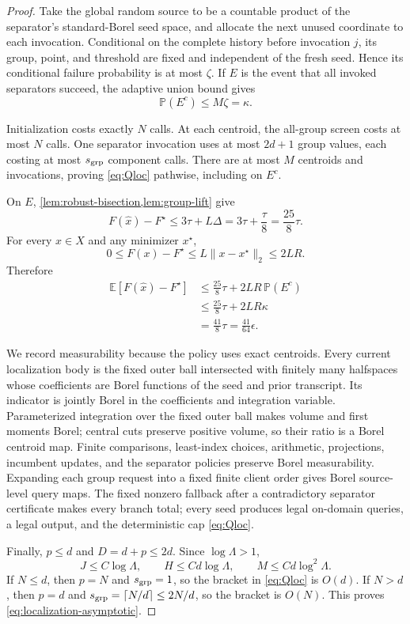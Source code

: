 \documentclass[11pt]{article}
\numberwithin{equation}{section}
\theoremstyle{remark}
\theoremstyle{definition}
\newcommand{\E}{\mathbb{E}}
\newcommand{\Pp}{\mathbb{P}}
\newcommand{\norm}[1]{\lVert #1\rVert_2}
\newcommand{\eps}{\epsilon}
\begin{document}
\begin{proof}
Take the global random source to be a countable product of the separator's standard-Borel seed space, and allocate the next unused coordinate to each invocation.  Conditional on the complete history before invocation $j$, its group, point, and threshold are fixed and independent of the fresh seed.  Hence its conditional failure probability is at most $\zeta$.  If $E$ is the event that all invoked separators succeed, the adaptive union bound gives
\[
\Pp(E^c)\le M\zeta=\kappa.
\]

Initialization costs exactly $N$ calls.  At each centroid, the all-group screen costs at most $N$ calls.  One separator invocation uses at most $2d+1$ group values, each costing at most $s_{\rm grp}$ component calls.  There are at most $M$ centroids and invocations, proving \eqref{eq:Qloc} pathwise, including on $E^c$.

On $E$, \cref{lem:robust-bisection,lem:group-lift} give
\[
F(\widehat x)-F^\star
\le3\tau+L\Delta
=3\tau+\frac\tau8
=\frac{25}{8}\tau.
\]
For every $x\in X$ and any minimizer $x^\star$,
\[
0\le F(x)-F^\star\le L\norm{x-x^\star}\le2LR.
\]
Therefore
\begin{align*}
\E[F(\widehat x)-F^\star]
&\le\frac{25}{8}\tau+2LR\,\Pp(E^c)\\
&\le\frac{25}{8}\tau+2LR\kappa\\
&=\frac{41}{8}\tau
=\frac{41}{64}\eps.
\end{align*}

We record measurability because the policy uses exact centroids.  Every current localization body is the fixed outer ball intersected with finitely many halfspaces whose coefficients are Borel functions of the seed and prior transcript.  Its indicator is jointly Borel in the coefficients and integration variable.  Parameterized integration over the fixed outer ball makes volume and first moments Borel; central cuts preserve positive volume, so their ratio is a Borel centroid map.  Finite comparisons, least-index choices, arithmetic, projections, incumbent updates, and the separator policies preserve Borel measurability.  Expanding each group request into a fixed finite client order gives Borel source-level query maps.  The fixed nonzero fallback after a contradictory separator certificate makes every branch total; every seed produces legal on-domain queries, a legal output, and the deterministic cap \eqref{eq:Qloc}.

Finally, $p\le d$ and $D=d+p\le2d$.  Since $\log\Lambda>1$,
\[
J\le C\log\Lambda,
\qquad
H\le Cd\log\Lambda,
\qquad
M\le Cd\log^2\Lambda.
\]
If $N\le d$, then $p=N$ and $s_{\rm grp}=1$, so the bracket in \eqref{eq:Qloc} is $O(d)$.  If $N>d$, then $p=d$ and $s_{\rm grp}=\lceil N/d\rceil\le2N/d$, so the bracket is $O(N)$.  This proves \eqref{eq:localization-asymptotic}.
\end{proof}
\end{document}
